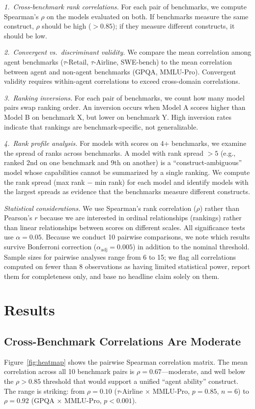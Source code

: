 \documentclass[sigconf]{acmart}
\begin{document}
\textit{1.~Cross-benchmark rank correlations.} For each pair of benchmarks, we compute Spearman's $\rho$ on the models evaluated on both. If benchmarks measure the same construct, $\rho$ should be high ($> 0.85$); if they measure different constructs, it should be low.

\textit{2.~Convergent vs.\ discriminant validity.} We compare the mean correlation among agent benchmarks ($\tau$-Retail, $\tau$-Airline, SWE-bench) to the mean correlation between agent and non-agent benchmarks (GPQA, MMLU-Pro). Convergent validity requires within-agent correlations to exceed cross-domain correlations.

\textit{3.~Ranking inversions.} For each pair of benchmarks, we count how many model pairs swap ranking order. An inversion occurs when Model A scores higher than Model B on benchmark X, but lower on benchmark Y. High inversion rates indicate that rankings are benchmark-specific, not generalizable.

\textit{4.~Rank profile analysis.} For models with scores on 4+ benchmarks, we examine the spread of ranks across benchmarks. A model with rank spread $> 5$ (e.g., ranked 2nd on one benchmark and 9th on another) is a ``construct-ambiguous'' model whose capabilities cannot be summarized by a single ranking. We compute the rank spread (max rank $-$ min rank) for each model and identify models with the largest spreads as evidence that the benchmarks measure different constructs.

\textit{Statistical considerations.} We use Spearman's rank correlation ($\rho$) rather than Pearson's $r$ because we are interested in ordinal relationships (rankings) rather than linear relationships between scores on different scales. All significance tests use $\alpha = 0.05$. Because we conduct 10 pairwise comparisons, we note which results survive Bonferroni correction ($\alpha_{\mathrm{adj}} = 0.005$) in addition to the nominal threshold. Sample sizes for pairwise analyses range from 6 to 15; we flag all correlations computed on fewer than 8 observations as having limited statistical power, report them for completeness only, and base no headline claim solely on them.

\section{Results}\label{sec:results}
\subsection{Cross-Benchmark Correlations Are Moderate}
Figure~\ref{fig:heatmap} shows the pairwise Spearman correlation matrix. The mean correlation across all 10 benchmark pairs is $\rho = 0.67$---moderate, and well below the $\rho > 0.85$ threshold that would support a unified ``agent ability'' construct. The range is striking: from $\rho = 0.10$ ($\tau$-Airline $\times$ MMLU-Pro, $p = 0.85$, $n = 6$) to $\rho = 0.92$ (GPQA $\times$ MMLU-Pro, $p < 0.001$).
\end{document}

